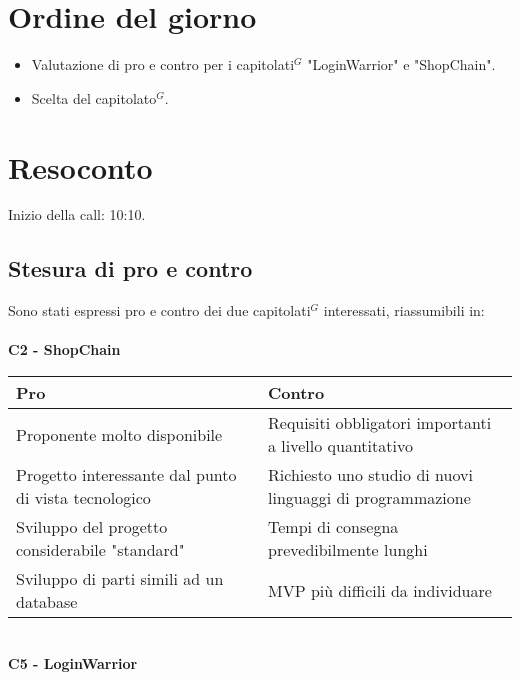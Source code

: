 \section{Ordine del giorno}

\begin{itemize}
	\item Valutazione di pro e contro per i capitolati$^{G}$ "LoginWarrior" e "ShopChain".
	\item Scelta del capitolato$^{G}$.
\end{itemize}

\section{Resoconto}
Inizio della call: 10:10.
\subsection{Stesura di pro e contro}
 Sono stati espressi pro e contro dei due capitolati$^{G}$ interessati, riassumibili in:\\ \\
 \textbf{C2 - ShopChain} \\
\begin{tabular}{|p{0.50\linewidth}|p{0.50 \linewidth}|}
	\hline
	\textbf{Pro} & \textbf{Contro}                                                                                                                                                                                                                                                                                        \\
	\hline
	Proponente molto disponibile & Requisiti obbligatori importanti a livello quantitativo\\
	\hline
	Progetto interessante dal punto di vista tecnologico & Richiesto uno studio di nuovi linguaggi di programmazione \\
	\hline
	Sviluppo del progetto considerabile "standard" & Tempi di consegna prevedibilmente lunghi\\
	\hline
	Sviluppo di parti simili ad un database& MVP più difficili da individuare \\
	\hline
\end{tabular}
\medskip
\\\noindent
\textbf{C5 - LoginWarrior} \\
